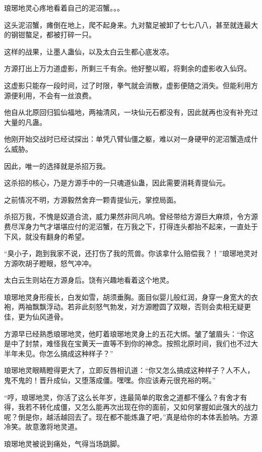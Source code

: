 
\begin{this_body}

琅琊地灵心疼地看着自己的泥沼蟹。。。

这头泥沼蟹，瘫倒在地上，爬不起身来。九对螯足被卸了七七八八，甚至就连最大的钢钳螯足，都被打碎一只。

这样的战果，让墨人蛊仙，以及太白云生都心底发凉。

方源打出上万力道虚影，所剩三千有余。他好整以暇，将剩余的虚影收入仙窍。

这虚影只能存一段时间，过了时限，拳气就会消散，虚影便随之消失。但能利用方源便利用，不会有一丝浪费。

他自从北原回归狐仙福地，两袖清风，一块仙元石都没有，因此就再也没有补充过大量的凡蛊。

他刚开始交战时已经试探出：单凭八臂仙僵之躯，难以对一身硬甲的泥沼蟹造成什么威胁。

因此，唯一的选择就是杀招万我。

这杀招的核心，乃是方源手中的一只魂道仙蛊，因此需要消耗青提仙元。

之前情况不明，方源毅然舍弃一颗青提仙元，掌控局面。

杀招万我，不愧是奴道合流，威力果然非同凡响。曾经带给方源巨大麻烦，令方源费尽浑身力气才堪堪应付的泥沼蟹，在万我之下，打得连头都抬不起来，一直处于下风，就没有翻身的希望。

“臭小子，跑到我家不说，还打伤了我的荒兽。你该拿什么赔偿我？！”琅琊地灵对方源吹胡子瞪眼，怒气冲冲。

太白云生则站在方源身后。饶有兴趣地看着这个地灵。

琅琊地灵身形瘦长，白发如雪，胡须垂胸。面目似婴儿般红润，身穿一身宽大的衣袍，两袖飘飘浮动。若非此刻怒气勃发，对方源瞪圆了双眼，否则会卖相无疑更佳，更为仙风道骨。

方源早已经熟悉琅琊地灵，他盯着琅琊地灵身上的五花大绑。皱了皱眉头：“你这是中了封禁，难怪我在宝黄天一直等不到你的神念。按照北原时间，我们也不过大半年未见。你怎么搞成这种样子？”

琅琊地灵眼睛瞪得更大了，立即反唇相讥道：“你又怎么搞成这种样子？人不人，鬼不鬼的！晋升成仙，又堕落成僵。嘿嘿。你应该寿元很充裕的啊。”

“哼，琅琊地灵，你活了这么长年岁，连最简单的取舍之道都不懂么？有舍才有得，我若不转化成僵，又怎么能再次出现在你的面前，又如何掌握如此强大的战力呢？倒是你，越活越回去了。现在都不能炼蛊了吧，”真是给你的本体丢脸呐。方源冷笑。故意激将地灵道。

琅琊地灵被说到痛处，气得当场跳脚。


\end{this_body}

